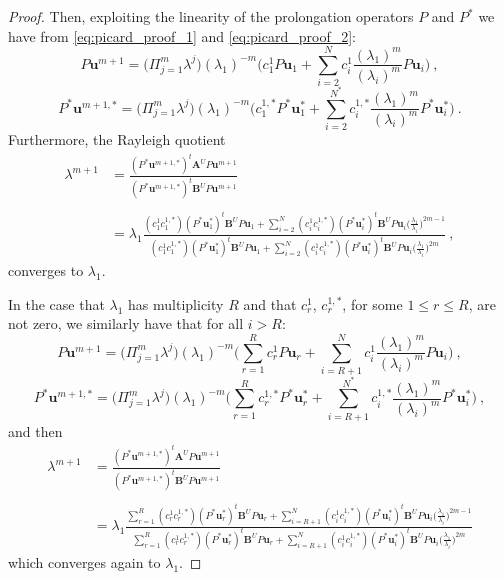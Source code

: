 \documentclass[smallextended]{svjour3}
\begin{document}
\begin{proof}
Then, exploiting the linearity of the prolongation operators 
$P$ and $P^*$ we have from \eqref{eq:picard_proof_1} and \eqref{eq:picard_proof_2}:
$$
P\mathbf{u}^{m+1}=\Big(\Pi_{j=1}^m\lambda^{j}\Big)(\lambda_1)^{-m}\Big( c_1^1 P\mathbf{u}_1 +
\sum_{i=2}^N c_i^1\frac{(\lambda_1)^m}{(\lambda_i)^{m}}P\mathbf{u}_i\Big) \ ,
$$
$$
P^*\mathbf{u}^{m+1,*}=\Big(\Pi_{j=1}^m\lambda^{j}\Big)(\lambda_1)^{-m}\Big( c_1^{1,*} P^*\mathbf{u}_1^* +
\sum_{i=2}^{N^*} c_i^{1,*}\frac{(\lambda_1)^m}{(\lambda_i)^{m}}P^*\mathbf{u}_i^*\Big) \ .
$$
Furthermore, the Rayleigh quotient
$$
\begin{array}{ll}
\displaystyle\lambda^{m+1}&\displaystyle=\frac{(P^*\mathbf{u}^{m+1,*})^t\mathbf{A}^U P\mathbf{u}^{m+1}}{(P^*\mathbf{u}^{m+1,*})^t\mathbf{B}^U P\mathbf{u}^{m+1}}\\
\\
&=\lambda_1 \frac{\displaystyle(c_1^1c_1^{1,*})(P^*\mathbf{u}^{*}_1)^t\mathbf{B}^U P\mathbf{u}_1 +
\sum_{i=2}^N (c_i^1c_i^{1,*})(P^*\mathbf{u}^{*}_i)^t\mathbf{B}^U P\mathbf{u}_i\Bigg(\frac{\lambda_1}{\lambda_i}\Bigg)^{2m-1}}
{\displaystyle(c_1^1c_1^{1,*})(P^*\mathbf{u}^{*}_1)^t\mathbf{B}^U P\mathbf{u}_1 +
\sum_{i=2}^N (c_i^1c_i^{1,*})(P^*\mathbf{u}^{*}_i)^t\mathbf{B}^U P\mathbf{u}_i\Bigg(\frac{\lambda_1}{\lambda_i}\Bigg)^{2m}}\ ,
\end{array}
$$
converges to $\lambda_1$.

In the case that $\lambda_1$ has multiplicity $R$ and that $c_r^1$, $c_r^{1,*}$, for some $1\leq r\leq R$, are not zero,
we similarly have that for all $i>R$:
$$
P\mathbf{u}^{m+1}=\Big(\Pi_{j=1}^m\lambda^{j}\Big)(\lambda_1)^{-m}\Big( \sum_{r=1}^Rc_r^1 P\mathbf{u}_r+
\sum_{i=R+1}^N c_i^1\frac{(\lambda_1)^m}{(\lambda_i)^{m}}P\mathbf{u}_i\Big) \ ,
$$
$$
P^*\mathbf{u}^{m+1,*}=\Big(\Pi_{j=1}^m\lambda^{j}\Big)(\lambda_1)^{-m}\Big( \sum_{r=1}^Rc_r^{1,*} P^*\mathbf{u}_r^*+
\sum_{i=R+1}^{N^*} c_i^{1,*}\frac{(\lambda_1)^m}{(\lambda_i)^{m}}P^*\mathbf{u}_i^*\Big) \ ,
$$
and then
$$
\begin{array}{ll}
\displaystyle\lambda^{m+1}&\displaystyle=\frac{(P^*\mathbf{u}^{m+1,*})^t\mathbf{A}^U P\mathbf{u}^{m+1}}{(P^*\mathbf{u}^{m+1,*})^t\mathbf{B}^U P\mathbf{u}^{m+1}}\\
\\
&\displaystyle=\lambda_1 \frac{\displaystyle \sum_{r=1}^R(c_r^1c_r^{1,*})(P^*\mathbf{u}^{*}_r)^t\mathbf{B}^U P\mathbf{u}_r +
\sum_{i=R+1}^N (c_i^1c_i^{1,*})(P^*\mathbf{u}^{*}_i)^t\mathbf{B}^U P\mathbf{u}_i\Bigg(\frac{\lambda_1}{\lambda_i}\Bigg)^{2m-1}}
{\displaystyle \sum_{r=1}^R(c_r^1c_r^{1,*})(P^*\mathbf{u}^{*}_r)^t\mathbf{B}^U P\mathbf{u}_r +
\sum_{i=R+1}^N (c_i^1c_i^{1,*})(P^*\mathbf{u}^{*}_i)^t\mathbf{B}^U P\mathbf{u}_i\Bigg(\frac{\lambda_1}{\lambda_i}\Bigg)^{2m}}
\end{array}
$$
which converges again to $\lambda_1$.


\end{proof}
\end{document}

